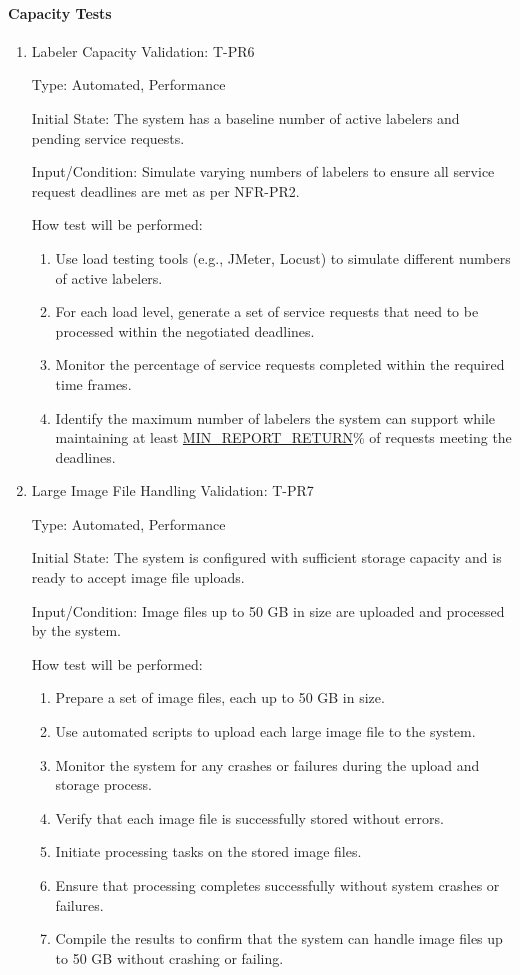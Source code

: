 \documentclass[12pt, titlepage]{article}
\begin{document}
\paragraph{Capacity Tests}
\begin{enumerate}

\item{Labeler Capacity Validation: T-PR6\\}

Type: Automated, Performance

Initial State: The system has a baseline number of active labelers and pending service requests.

Input/Condition: Simulate varying numbers of labelers to ensure all service request deadlines are met as per NFR-PR2.

How test will be performed:
\begin{enumerate}
    \item Use load testing tools (e.g., JMeter, Locust) to simulate different numbers of active labelers.
    \item For each load level, generate a set of service requests that need to be processed within the negotiated deadlines.
    \item Monitor the percentage of service requests completed within the required time frames.
    \item Identify the maximum number of labelers the system can support while maintaining at least \hyperref[MIN_REPORT_RETURN]{MIN\_REPORT\_RETURN}\% of requests meeting the deadlines.
\end{enumerate}

\item{Large Image File Handling Validation: T-PR7\\}

Type: Automated, Performance

Initial State: The system is configured with sufficient storage capacity and is ready to accept image file uploads.

Input/Condition: Image files up to 50 GB in size are uploaded and processed by the system.

How test will be performed:
\begin{enumerate}
    \item Prepare a set of image files, each up to 50 GB in size.
    \item Use automated scripts to upload each large image file to the system.
    \item Monitor the system for any crashes or failures during the upload and storage process.
    \item Verify that each image file is successfully stored without errors.
    \item Initiate processing tasks on the stored image files.
    \item Ensure that processing completes successfully without system crashes or failures.
    \item Compile the results to confirm that the system can handle image files up to 50 GB without crashing or failing.
\end{enumerate}

\end{enumerate}
\end{document}
